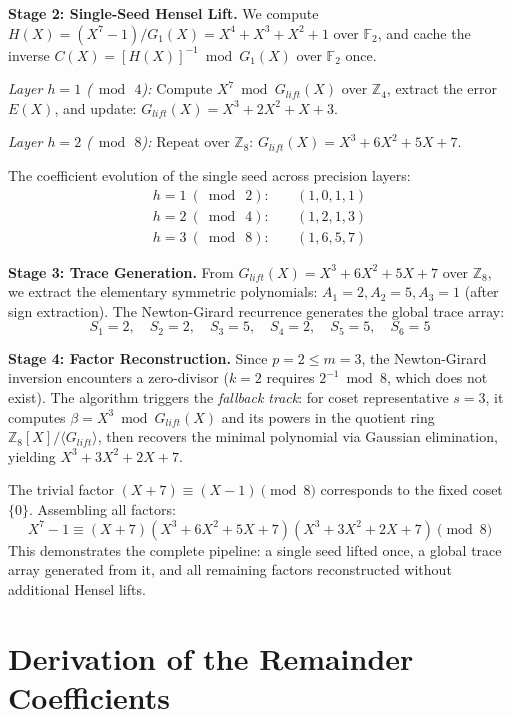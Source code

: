 \documentclass[12pt]{article}
\theoremstyle{plain}
\begin{document}
\textbf{Stage 2: Single-Seed Hensel Lift.}
We compute $H(X) = (X^7-1)/G_1(X) = X^4 + X^3 + X^2 + 1$ over $\mathbb{F}_2$, and cache the inverse $C(X) = [H(X)]^{-1} \bmod G_1(X)$ over $\mathbb{F}_2$ once.

\emph{Layer $h=1$ ($\bmod\,4$):} Compute $X^7 \bmod G_{lift}(X)$ over $\mathbb{Z}_4$, extract the error $E(X)$, and update: $G_{lift}(X) = X^3 + 2X^2 + X + 3$.

\emph{Layer $h=2$ ($\bmod\,8$):} Repeat over $\mathbb{Z}_8$: $G_{lift}(X) = X^3 + 6X^2 + 5X + 7$.

The coefficient evolution of the single seed across precision layers:
\begin{align*}
    h=1 \ (\bmod\ 2): \quad & (1, 0, 1, 1) \\
    h=2 \ (\bmod\ 4): \quad & (1, 2, 1, 3) \\
    h=3 \ (\bmod\ 8): \quad & (1, 6, 5, 7) 
\end{align*}

\textbf{Stage 3: Trace Generation.}
From $G_{lift}(X) = X^3 + 6X^2 + 5X + 7$ over $\mathbb{Z}_8$, we extract the elementary symmetric polynomials: $A_1 = 2, A_2 = 5, A_3 = 1$ (after sign extraction). The Newton-Girard recurrence generates the global trace array:
\begin{equation*}
    S_1 = 2, \quad S_2 = 2, \quad S_3 = 5, \quad S_4 = 2, \quad S_5 = 5, \quad S_6 = 5
\end{equation*}

\textbf{Stage 4: Factor Reconstruction.}
Since $p = 2 \leq m = 3$, the Newton-Girard inversion encounters a zero-divisor ($k=2$ requires $2^{-1} \bmod 8$, which does not exist). The algorithm triggers the \emph{fallback track}: for coset representative $s = 3$, it computes $\beta = X^3 \bmod G_{lift}(X)$ and its powers in the quotient ring $\mathbb{Z}_8[X]/\langle G_{lift} \rangle$, then recovers the minimal polynomial via Gaussian elimination, yielding $X^3 + 3X^2 + 2X + 7$.

The trivial factor $(X+7) \equiv (X-1) \pmod{8}$ corresponds to the fixed coset $\{0\}$. Assembling all factors:
\begin{equation}
    X^7-1 \equiv (X+7)(X^3+6X^2+5X+7)(X^3+3X^2+2X+7) \pmod 8
\end{equation}
This demonstrates the complete pipeline: a single seed lifted once, a global trace array generated from it, and all remaining factors reconstructed without additional Hensel lifts.


\section{Derivation of the Remainder Coefficients}
\label{app:dickson_derivation}
\end{document}
